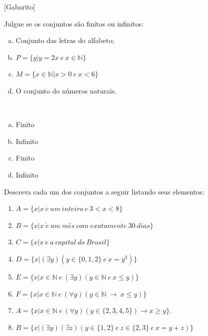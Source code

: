 \documentclass[a4paper, 12pt, addpoints]{exam}
\begin{document}
\info\vspace{-1 cm} %
[Gabarito]
\begin{questions}%
  \question Julgue se os conjuntos são finitos ou infinitos:
  \begin{enumerate}[a)]
    \item Conjunto das letras do alfabeto;
    \item $P = \{y | y = 2x ~ e ~ x \in \mathbb{N} \}$
    \item $M = \{x \in \mathbb{N} | x > 0 ~ e ~ x < 6\}$
    \item O conjunto do números naturais.
\end{enumerate}  
  
    \begin{resp}~
        \begin{multicols}{4}
        \begin{enumerate}[a)]
            \item Finito
            \item Infinito
            \item Finito
            \item Infinito
        \end{enumerate}
    \end{multicols}
    
    \end{resp}

  \question Descreva cada um dos conjuntos a seguir listando seus elementos:

  \begin{multicols}{2}
    \begin{enumerate}
      \item $A=\{x|x ~ \acute{e} ~ um ~ inteiro ~ e ~ 3 < x < 8\}$
      \item $B=\{x|x ~ \acute{e} ~ um ~ m\hat{e}s ~ com ~ exatamente ~ 30 ~ dias\}$
      \item $C=\{x|x ~ \acute{e} ~ a ~ capital ~ do ~ Brasil\}$
      \item $D=\{x|(\exists y)(y \in \{0,1,2\} ~ e ~ x = y^3)\}$
      \item $E=\{x|x \in \mathbb{N} ~ e ~ (\exists y)(y \in \mathbb{N} ~ e ~ x \leq y)\}$
      \item $F=\{x|x \in \mathbb{N} ~ e ~ (\forall y)(y \in \mathbb{N} ~ \rightarrow ~ x \leq y)\}$
      \item $A = \{x | x \in \mathbb{N} ~ e ~ (\forall y)(y \in \{2, 3, 4, 5\}) \rightarrow x \geq y\}.$
      \item $B = \{x | (\exists y)(\exists z)(y \in \{1,2\} ~ e ~ z \in \{2,3\} ~ e ~ x=y+z)\}$
  \end{enumerate}    
  \end{multicols}


\end{questions}
\end{document}
